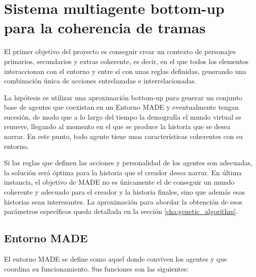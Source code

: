\chapter{Sistema multiagente bottom-up para la coherencia de tramas}

El primer objetivo del proyecto es conseguir crear un contexto de personajes primarios, secundarios y extras coherente, es decir, en el que todos los elementos interaccionan con el entorno y entre sí con unas reglas definidas, generando una combinación única de acciones entrelazadas e interrelacionadas.

La hipótesis es utilizar una aproximación bottom-up para generar un conjunto base de agentes que coexistan en un Entorno MADE y eventualmente tengan sucesión, de modo que a lo largo del tiempo la demografía el mundo virtual se renueve, llegando al momento en el que se produce la historia que se desea narrar. En este punto, todo agente tiene unas características coherentes con su entorno.

Si las reglas que definen las acciones y personalidad de los agentes son adecuadas, la solución será óptima para la historia que el creador desea narrar. En última instancia, el objetivo de MADE no es únicamente el de conseguir un mundo coherente y adecuado para el creador y la historia finales, sino que además esas historias sean interesantes. La aproximación para abordar la obtención de esos parámetros específicos queda detallada en la sección \ref{cha:genetic_algorithm}.


\section{Entorno MADE}

El entorno MADE se define como aquel donde conviven los agentes y que coordina su funcionamiento. Sus funciones son las siguientes:

